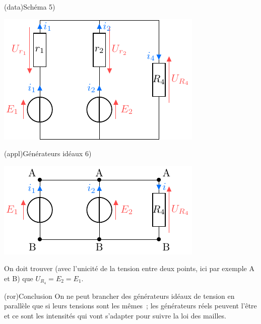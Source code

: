 \documentclass[../../main/main.tex]{subfiles}
\begin{document}
{\begin{enumerate}
\begin{tcbraster}[raster columns=5, raster equal height=rows]
    \begin{tcb}[raster multicolumn=2](data){Schéma}
        5)
        \vspace*{-12pt}
        \begin{center}
            \includegraphics{assogen_parr}
        \end{center}
    \end{tcb}
    \begin{tcb}[raster multicolumn=3](appl){Générateurs idéaux}
        6)\vspace*{-20pt}
        \begin{center}
            \includegraphics{assogen_parr-ideal}
        \end{center}
        On doit trouver (avec l'unicité de la tension entre deux points, ici par
        exemple A et B) que $U_{R_4} = E_2 = E_1$.
    \end{tcb}
\end{tcbraster}
\begin{center}
    \begin{tcb}[width=\linewidth](ror){Conclusion}
        On ne peut brancher des générateurs idéaux de tension en parallèle que
        si leurs tensions sont les mêmes~; les générateurs réels peuvent l'être
        et ce sont les intensités qui vont s'adapter pour suivre la loi des
        mailles.
    \end{tcb}
\end{center}
  \end{enumerate}
}
\end{document}

